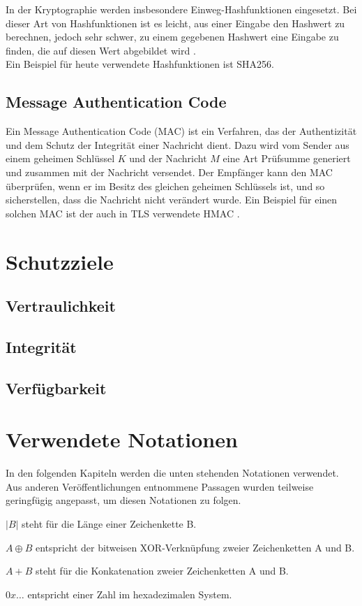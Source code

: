 In der Kryptographie werden insbesondere Einweg-Hashfunktionen eingesetzt. Bei dieser Art von Hashfunktionen ist es leicht, aus einer Eingabe den Hashwert zu berechnen, jedoch sehr schwer, zu einem gegebenen Hashwert eine Eingabe zu finden, die auf diesen Wert abgebildet wird \cite{Schneier2006}. \\Ein Beispiel für heute verwendete Hashfunktionen ist SHA256.

\subsection{Message Authentication Code}

\label{sec_mac}

Ein Message Authentication Code (MAC) ist ein Verfahren, das der Authentizität und dem Schutz der Integrität einer Nachricht dient. Dazu wird vom Sender aus einem geheimen Schlüssel \(K\) und der Nachricht \(M\) eine Art Prüfsumme generiert und zusammen mit der Nachricht versendet. Der Empfänger kann den MAC überprüfen, wenn er im Besitz des gleichen geheimen Schlüssels ist, und so sicherstellen, dass die Nachricht nicht verändert wurde. Ein Beispiel für einen solchen MAC ist der auch in TLS verwendete HMAC \cite{Schneier2006, ferguson10}.

\section{Schutzziele}

\subsection{Vertraulichkeit}

\subsection{Integrität}

\subsection{Verfügbarkeit}

\section{Verwendete Notationen}

In den folgenden Kapiteln werden die unten stehenden Notationen verwendet. Aus anderen Veröffentlichungen entnommene Passagen wurden teilweise geringfügig angepasst, um diesen Notationen zu folgen.

\(|B|\) steht für die Länge einer Zeichenkette B.

\(A \oplus B\) entspricht der bitweisen XOR-Verknüpfung zweier Zeichenketten A und B.

\(A + B\) steht für die Konkatenation zweier Zeichenketten A und B.

\(0x\dots\) entspricht einer Zahl im hexadezimalen System.

